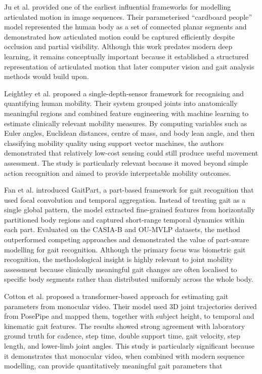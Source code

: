 \documentclass[12pt]{elsarticle}
\begin{document}
Ju et al. \cite{ju1996cardboard} provided one of the earliest influential frameworks for modelling articulated motion in image sequences. Their parameterised ``cardboard people'' model represented the human body as a set of connected planar segments and demonstrated how articulated motion could be captured efficiently despite occlusion and partial visibility. Although this work predates modern deep learning, it remains conceptually important because it established a structured representation of articulated motion that later computer vision and gait analysis methods would build upon.

Leightley et al. \cite{leightley2016automated} proposed a single-depth-sensor framework for recognising and quantifying human mobility. Their system grouped joints into anatomically meaningful regions and combined feature engineering with machine learning to estimate clinically relevant mobility measures. By computing variables such as Euler angles, Euclidean distances, centre of mass, and body lean angle, and then classifying mobility quality using support vector machines, the authors demonstrated that relatively low-cost sensing could still produce useful movement assessment. The study is particularly relevant because it moved beyond simple action recognition and aimed to provide interpretable mobility outcomes.

Fan et al. \cite{fan2020gaitpart} introduced GaitPart, a part-based framework for gait recognition that used focal convolution and temporal aggregation. Instead of treating gait as a single global pattern, the model extracted fine-grained features from horizontally partitioned body regions and captured short-range temporal dynamics within each part. Evaluated on the CASIA-B and OU-MVLP datasets, the method outperformed competing approaches and demonstrated the value of part-aware modelling for gait recognition. Although the primary focus was biometric gait recognition, the methodological insight is highly relevant to joint mobility assessment because clinically meaningful gait changes are often localised to specific body segments rather than distributed uniformly across the whole body.

Cotton et al. \cite{cotton2022transforming} proposed a transformer-based approach for estimating gait parameters from monocular video. Their model used 3D joint trajectories derived from PosePipe and mapped them, together with subject height, to temporal and kinematic gait features. The results showed strong agreement with laboratory ground truth for cadence, step time, double support time, gait velocity, step length, and lower-limb joint angles. This study is particularly significant because it demonstrates that monocular video, when combined with modern sequence modelling, can provide quantitatively meaningful gait parameters that 
\end{document}
